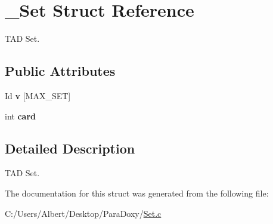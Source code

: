 \hypertarget{struct___set}{\section{\-\_\-\-Set Struct Reference}
\label{struct___set}
}


T\-A\-D Set.  


\subsection*{Public Attributes}
\begin{DoxyCompactItemize}
\item 
\hypertarget{struct___set_a3c72d1780e4b24269a6adcf59ed7fd65}{Id {\bfseries v} \mbox{[}M\-A\-X\-\_\-\-S\-E\-T\mbox{]}}\label{struct___set_a3c72d1780e4b24269a6adcf59ed7fd65}

\item 
\hypertarget{struct___set_afc4f545ff1fc4ad05f52990484963c58}{int {\bfseries card}}\label{struct___set_afc4f545ff1fc4ad05f52990484963c58}

\end{DoxyCompactItemize}


\subsection{Detailed Description}
T\-A\-D Set. 


\begin{DoxyItemize}
\item 
\end{DoxyItemize}

The documentation for this struct was generated from the following file\-:\begin{DoxyCompactItemize}
\item 
C\-:/\-Users/\-Albert/\-Desktop/\-Para\-Doxy/\hyperlink{_set_8c}{Set.\-c}\end{DoxyCompactItemize}
